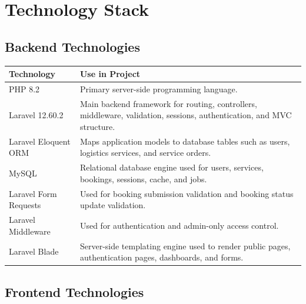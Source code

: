 \documentclass[12pt,a4paper]{report}
\begin{document}
\chapter{Technology Stack}

\section{Backend Technologies}

\begin{longtable}{L{0.28\textwidth} L{0.62\textwidth}}
\toprule
\textbf{Technology} & \textbf{Use in Project} \\
\midrule
PHP 8.2 & Primary server-side programming language. \\
Laravel 12.60.2 & Main backend framework for routing, controllers, middleware, validation, sessions, authentication, and MVC structure. \\
Laravel Eloquent ORM & Maps application models to database tables such as users, logistics services, and service orders. \\
MySQL & Relational database engine used for users, services, bookings, sessions, cache, and jobs. \\
Laravel Form Requests & Used for booking submission validation and booking status update validation. \\
Laravel Middleware & Used for authentication and admin-only access control. \\
Laravel Blade & Server-side templating engine used to render public pages, authentication pages, dashboards, and forms. \\
\bottomrule
\end{longtable}

\section{Frontend Technologies}
\end{document}
